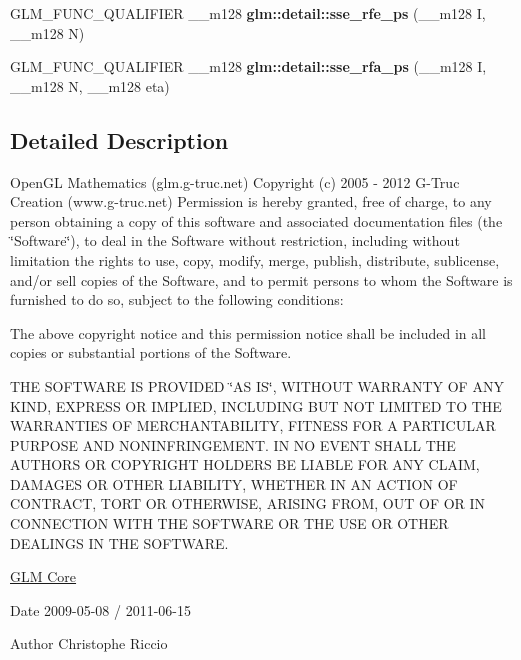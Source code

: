 \begin{DoxyCompactItemize}
\item 
\hypertarget{namespaceglm_1_1detail_a48dc48d40e141bd2fff6b9c88b7e05e4}{G\-L\-M\-\_\-\-F\-U\-N\-C\-\_\-\-Q\-U\-A\-L\-I\-F\-I\-E\-R \-\_\-\-\_\-m128 {\bfseries glm\-::detail\-::sse\-\_\-rfe\-\_\-ps} (\-\_\-\-\_\-m128 I, \-\_\-\-\_\-m128 N)}\label{namespaceglm_1_1detail_a48dc48d40e141bd2fff6b9c88b7e05e4}

\item 
\hypertarget{namespaceglm_1_1detail_a5086fa9f09dcfec333b9eebeae468767}{G\-L\-M\-\_\-\-F\-U\-N\-C\-\_\-\-Q\-U\-A\-L\-I\-F\-I\-E\-R \-\_\-\-\_\-m128 {\bfseries glm\-::detail\-::sse\-\_\-rfa\-\_\-ps} (\-\_\-\-\_\-m128 I, \-\_\-\-\_\-m128 N, \-\_\-\-\_\-m128 eta)}\label{namespaceglm_1_1detail_a5086fa9f09dcfec333b9eebeae468767}

\end{DoxyCompactItemize}


\subsection{Detailed Description}
Open\-G\-L Mathematics (glm.\-g-\/truc.\-net) Copyright (c) 2005 -\/ 2012 G-\/\-Truc Creation (www.\-g-\/truc.\-net) Permission is hereby granted, free of charge, to any person obtaining a copy of this software and associated documentation files (the \char`\"{}\-Software\char`\"{}), to deal in the Software without restriction, including without limitation the rights to use, copy, modify, merge, publish, distribute, sublicense, and/or sell copies of the Software, and to permit persons to whom the Software is furnished to do so, subject to the following conditions\-:

The above copyright notice and this permission notice shall be included in all copies or substantial portions of the Software.

T\-H\-E S\-O\-F\-T\-W\-A\-R\-E I\-S P\-R\-O\-V\-I\-D\-E\-D \char`\"{}\-A\-S I\-S\char`\"{}, W\-I\-T\-H\-O\-U\-T W\-A\-R\-R\-A\-N\-T\-Y O\-F A\-N\-Y K\-I\-N\-D, E\-X\-P\-R\-E\-S\-S O\-R I\-M\-P\-L\-I\-E\-D, I\-N\-C\-L\-U\-D\-I\-N\-G B\-U\-T N\-O\-T L\-I\-M\-I\-T\-E\-D T\-O T\-H\-E W\-A\-R\-R\-A\-N\-T\-I\-E\-S O\-F M\-E\-R\-C\-H\-A\-N\-T\-A\-B\-I\-L\-I\-T\-Y, F\-I\-T\-N\-E\-S\-S F\-O\-R A P\-A\-R\-T\-I\-C\-U\-L\-A\-R P\-U\-R\-P\-O\-S\-E A\-N\-D N\-O\-N\-I\-N\-F\-R\-I\-N\-G\-E\-M\-E\-N\-T. I\-N N\-O E\-V\-E\-N\-T S\-H\-A\-L\-L T\-H\-E A\-U\-T\-H\-O\-R\-S O\-R C\-O\-P\-Y\-R\-I\-G\-H\-T H\-O\-L\-D\-E\-R\-S B\-E L\-I\-A\-B\-L\-E F\-O\-R A\-N\-Y C\-L\-A\-I\-M, D\-A\-M\-A\-G\-E\-S O\-R O\-T\-H\-E\-R L\-I\-A\-B\-I\-L\-I\-T\-Y, W\-H\-E\-T\-H\-E\-R I\-N A\-N A\-C\-T\-I\-O\-N O\-F C\-O\-N\-T\-R\-A\-C\-T, T\-O\-R\-T O\-R O\-T\-H\-E\-R\-W\-I\-S\-E, A\-R\-I\-S\-I\-N\-G F\-R\-O\-M, O\-U\-T O\-F O\-R I\-N C\-O\-N\-N\-E\-C\-T\-I\-O\-N W\-I\-T\-H T\-H\-E S\-O\-F\-T\-W\-A\-R\-E O\-R T\-H\-E U\-S\-E O\-R O\-T\-H\-E\-R D\-E\-A\-L\-I\-N\-G\-S I\-N T\-H\-E S\-O\-F\-T\-W\-A\-R\-E.

\hyperlink{group__core}{G\-L\-M Core}

\begin{DoxyDate}{Date}
2009-\/05-\/08 / 2011-\/06-\/15 
\end{DoxyDate}
\begin{DoxyAuthor}{Author}
Christophe Riccio 
\end{DoxyAuthor}
